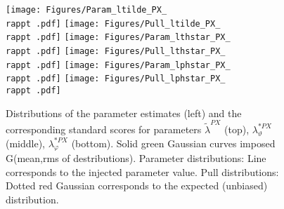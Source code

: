 \documentclass[12pt]{article}
\newcommand{\lamtildePX}{\tilde{\lambda}^{\scriptscriptstyle PX}}
\newcommand{\lamthstarPX}{\lambda^{* \scriptscriptstyle PX}_\vartheta}
\newcommand{\lamphstarPX}{\lambda^{* \scriptscriptstyle PX}_\varphi}
\providecommand{\rappt}[1]{rap1pt1cpm1}%
\begin{document}
\begin{figure}[htbp]
\centering
\texttt{[image: Figures/Param\_ltilde\_PX\_\\rappt .pdf]}
\texttt{[image: Figures/Pull\_ltilde\_PX\_\\rappt .pdf]}
\texttt{[image: Figures/Param\_lthstar\_PX\_\\rappt .pdf]}
\texttt{[image: Figures/Pull\_lthstar\_PX\_\\rappt .pdf]}
\texttt{[image: Figures/Param\_lphstar\_PX\_\\rappt .pdf]}
\texttt{[image: Figures/Pull\_lphstar\_PX\_\\rappt .pdf]}
\caption{Distributions of the parameter estimates (left) and the corresponding
standard scores for parameters $\lamtildePX$ (top), $\lamthstarPX$ (middle),
$\lamphstarPX$ (bottom). Solid green Gaussian curves imposed G(mean,rms of
destributions). Parameter distributions: Line corresponds to the injected parameter value.
Pull distributions: Dotted red Gaussian corresponds to the expected
(unbiased) distribution.}
\end{figure}
\clearpage
\end{document}

